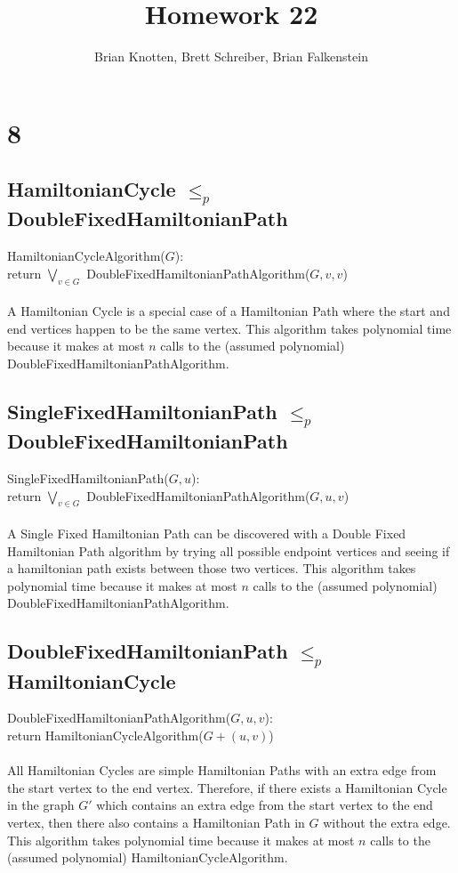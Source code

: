 \documentclass[letterpaper,notitlepage,twoside]{article}
\newcommand\tab[1][1cm]{\hspace*{#1}} %
\begin{document}
\title{Homework 22}
\author{Brian Knotten, Brett Schreiber, Brian Falkenstein}
\maketitle
\section*{8}
\subsection*{HamiltonianCycle $\leq_p$ DoubleFixedHamiltonianPath}
HamiltonianCycleAlgorithm($G$):\\
\tab return $\bigvee_{v \in G}$ DoubleFixedHamiltonianPathAlgorithm($G, v, v$)
\\\\
A Hamiltonian Cycle is a special case of a Hamiltonian Path where the start and end vertices happen to be the same vertex. This algorithm takes polynomial time because it makes at most $n$ calls to the (assumed polynomial) DoubleFixedHamiltonianPathAlgorithm.

\subsection*{SingleFixedHamiltonianPath $\leq_p$ DoubleFixedHamiltonianPath}
SingleFixedHamiltonianPath($G, u$):\\
\tab return $\bigvee_{v \in G}$ DoubleFixedHamiltonianPathAlgorithm($G, u, v$)
\\\\
A Single Fixed Hamiltonian Path can be discovered with a Double Fixed Hamiltonian Path algorithm by trying all possible endpoint vertices and seeing if a hamiltonian path exists between those two vertices. This algorithm takes polynomial time because it makes at most $n$ calls to the (assumed polynomial) DoubleFixedHamiltonianPathAlgorithm.

\subsection*{DoubleFixedHamiltonianPath $\leq_p$ HamiltonianCycle}
DoubleFixedHamiltonianPathAlgorithm($G, u, v$):\\
\tab return HamiltonianCycleAlgorithm($G + (u, v)$)
\\\\
All Hamiltonian Cycles are simple Hamiltonian Paths with an extra edge from the start vertex to the end vertex. Therefore, if there exists a Hamiltonian Cycle in the graph $G'$ which contains an extra edge from the start vertex to the end vertex, then there also contains a Hamiltonian Path in $G$ without the extra edge. This algorithm takes polynomial time because it makes at most $n$ calls to the (assumed polynomial) HamiltonianCycleAlgorithm.
\end{document}
